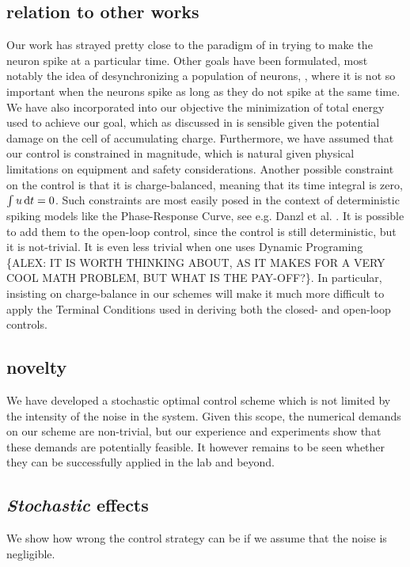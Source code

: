 \documentclass{article}
\begin{document}
\subsection{relation to other works}
Our work has strayed pretty close to the paradigm of \cite{Ahmadian2011} in
trying to make the neuron spike at a particular time. Other goals have been
formulated, most notably the idea of desynchronizing a population of neurons,
\cite{Nabi2011}, where it is not so important when the neurons spike as long as
they do not spike at the same time. We have also incorporated into our objective
the minimization of total energy used to achieve our goal, which as discussed in
\cite{Ahmadian2011} is sensible given the potential damage on the cell of
accumulating charge. Furthermore, we have assumed that our control is
constrained in magnitude, which is natural given physical limitations on
equipment and safety considerations. Another possible constraint on the control
is that it is charge-balanced, meaning that its time integral is zero, $\int u
\, \mathrm{d} t = 0$. Such constraints are most easily posed in the context of
deterministic spiking models like the Phase-Response Curve, see e.g. Danzl et
al. \cite{Danzl2010}. It is possible to add them to the open-loop control, since
the control is still deterministic, but it is not-trivial. It is even less
trivial when one uses Dynamic Programing \{ALEX: IT IS WORTH THINKING ABOUT, AS
IT MAKES FOR A VERY COOL MATH PROBLEM, BUT WHAT IS THE PAY-OFF?\}. In
particular, insisting on charge-balance in our schemes will make it much more
difficult to apply the Terminal Conditions used in deriving both the closed- and
open-loop controls.

\subsection{novelty}
We have developed a stochastic optimal control scheme which is not limited
by the intensity of the noise in the system. Given this scope, the
numerical demands on our scheme are non-trivial, but our experience and
experiments show that these demands are potentially feasible. It
however remains to be seen whether they can be successfully applied in the lab
and beyond.

\subsection{{\sl Stochastic} effects} 
We show how wrong the control strategy can be if we assume that the noise is
negligible. 
\end{document}

